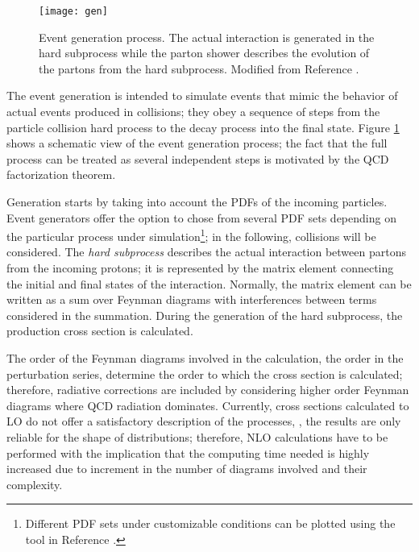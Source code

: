\begin{figure}[!h]
  \centering
  \texttt{[image: gen]}
  \caption[Event generation process.]{Event generation process. The actual interaction is generated in the hard subprocess while the parton shower describes the evolution of the partons from the hard subprocess. Modified from Reference \cite{gen_scheme}.}\label{fig:gen}
\end{figure}

The event generation is intended to simulate events that mimic the behavior of actual events produced in collisions; they obey a sequence of steps from the particle collision hard process to the decay process into the final state. Figure \ref{fig:gen} shows a schematic view of the event generation process; the fact that the full process can be treated as several independent steps is motivated by the QCD factorization theorem.

Generation starts by taking into account the PDFs of the incoming particles. Event generators offer the option to chose from several PDF sets depending on the particular process under simulation\footnote{Different PDF sets under customizable conditions can be plotted using the tool in Reference \cite{pdfplot}.}; in the following, \pp collisions will be considered. The \textit{hard subprocess} describes the actual interaction between partons from the incoming protons; it is represented by the matrix element connecting the initial and final states of the interaction. Normally, the matrix element can be written as a sum over Feynman diagrams with interferences between terms considered in the summation. During the generation of the hard subprocess, the production cross section is calculated. 

The order of the Feynman diagrams involved in the calculation, \ie the order in the perturbation series, determine the order to which the cross section is calculated; therefore, radiative corrections are included by considering higher order Feynman diagrams where QCD radiation dominates. Currently, cross sections calculated to LO do not offer a satisfactory description of the processes, \ie, the results are only reliable for the shape of distributions; therefore, NLO calculations have to be performed with the implication that the computing time needed is highly increased due to increment in the number of diagrams involved and their complexity.       

